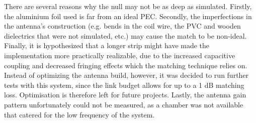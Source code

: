 There are several reasons why the null may not be as deep as simulated. Firstly, the aluminium foil used is far from an ideal PEC. Secondly, the imperfections in the antenna's construction (e.g. bends in the coil wire, the PVC and wooden dielectrics that were not simulated, etc.) may cause the match to be non-ideal. Finally, it is hypothesized that a longer strip might have made the implementation more practically realizable, due to the increased capacitive coupling and decreased fringing effects which the matching technique relies on. Instead of optimizing the antenna build, however, it was decided to run further tests with this system, since the link budget allows for up to a 1 dB matching loss. Optimisation is therefore left for future projects. Lastly, the antenna gain pattern unfortunately could not be measured, as a chamber was not available that catered for the low frequency of the system.